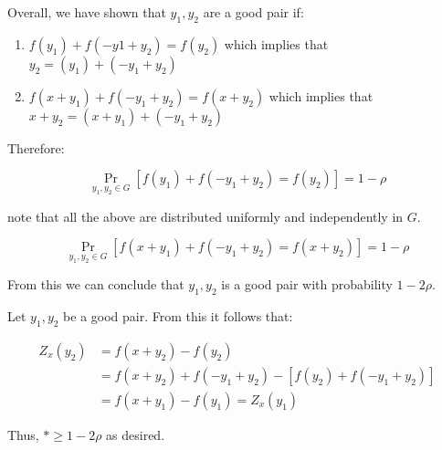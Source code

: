 \documentclass{idc_msc}
\begin{document}
Overall, we have shown that \(y_1, y_2\) are a good pair if:

\begin{enumerate}
  \item \(f(y_1) + f(-y1 + y_2) = f(y_2)\) which implies that \(y_2 = (y_1) + (-y_1 + y_2)\)
  \item \(f(x+y_1) + f(-y_1 + y_2) = f(x + y_2)\) which implies that \(x + y_2 = (x+y_1) + (-y_1 + y_2)\)
\end{enumerate}

Therefore:

\[
  \Pr_{y_1, y_2 \in G} \left[ f(y_1) + f(-y_1 + y_2) = f(y_2) \right] = 1-\rho
\]

note that all the above are distributed uniformly and independently in \(G\).

\[
  \Pr_{y_1, y_2 \in G} \left[f(x+y_1) + f(-y_1 + y_2) = f(x + y_2)\right] = 1 - \rho
\]

From this we can conclude that \(y_1, y_2\) is a good pair with probability \(1 - 2 \rho\).

Let \(y_1, y_2\) be a good pair.
From this it follows that:

\[
\begin{aligned}
  Z_x(y_2) &= f(x + y_2) - f(y_2) \\
  &= f(x+y_2) + f(-y_1 + y_2) - \left[f(y_2) + f(-y_1 + y_2)\right] \\
  &= f(x + y_1) - f(y_1) = Z_x(y_1)
\end{aligned}
\]

Thus, \(* \ge 1 - 2\rho\) as desired.
\end{document}
